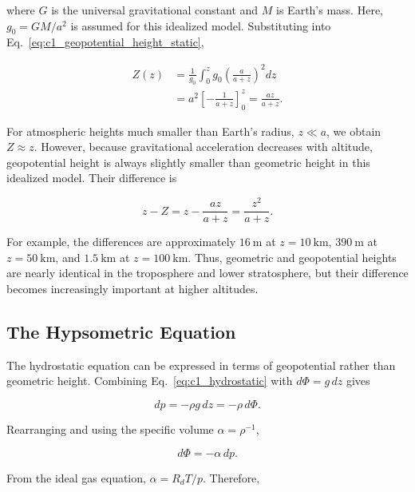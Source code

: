 \documentclass[10pt,twocolumn]{memoir}
\begin{document}
where $G$ is the universal gravitational constant and $M$ is Earth's mass. Here, $g_0 = GM/a^2$ is assumed for this idealized model. Substituting into Eq.~\ref{eq:c1_geopotential_height_static},

\begin{equation}
\begin{aligned}
    Z(z)
    &=\frac{1}{g_0}\int_0^z g_0\left(\frac{a}{a+z}\right)^2 dz\\
    &=a^2\left[-\frac{1}{a+z}\right]_0^z
    =\frac{az}{a+z}.
\end{aligned}
\label{eq:c1_geopotential_geometric_relation}
\end{equation}

For atmospheric heights much smaller than Earth's radius, $z\ll a$, we obtain $Z\approx z$. However, because gravitational acceleration decreases with altitude, geopotential height is always slightly smaller than geometric height in this idealized model. Their difference is

\begin{equation}
    z-Z=z-\frac{az}{a+z}=\frac{z^2}{a+z}.
\end{equation}

For example, the differences are approximately $16\ \mathrm{m}$ at $z=10\ \mathrm{km}$, $390\ \mathrm{m}$ at $z=50\ \mathrm{km}$, and $1.5\ \mathrm{km}$ at $z=100\ \mathrm{km}$. Thus, geometric and geopotential heights are nearly identical in the troposphere and lower stratosphere, but their difference becomes increasingly important at higher altitudes.

\subsection{The Hypsometric Equation}

The hydrostatic equation can be expressed in terms of geopotential rather than geometric height. Combining Eq.~\ref{eq:c1_hydrostatic} with $d\Phi=g\,dz$ gives

\begin{equation}
    dp=-\rho g\,dz=-\rho\,d\Phi.
\end{equation}

Rearranging and using the specific volume $\alpha=\rho^{-1}$,

\begin{equation}
    d\Phi=-\alpha\,dp.
\end{equation}

From the ideal gas equation, $\alpha=R_dT/p$. Therefore,
\end{document}
